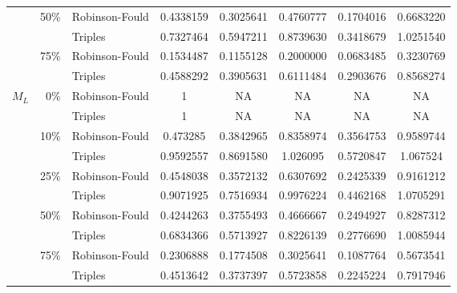 \begin{tabular}{rrlccccc}
              & 50\%         & Robinson-Fould & 0.4338159 & 0.3025641  & 0.4760777 & 0.1704016  & 0.6683220 \\
              &              & Triples        & 0.7327464 & 0.5947211  & 0.8739630 & 0.3418679  & 1.0251540 \\
              & 75\%         & Robinson-Fould & 0.1534487 & 0.1155128  & 0.2000000 & 0.0683485  & 0.3230769 \\
              &              & Triples        & 0.4588292 & 0.3905631  & 0.6111484 & 0.2903676  & 0.8568274 \\   
    $M_L$     & 0\%          & Robinson-Fould & 1 & NA  & NA & NA  & NA \\
              &              & Triples        & 1 & NA  & NA & NA  & NA \\
              & 10\%         & Robinson-Fould & 0.473285 & 0.3842965  & 0.8358974 & 0.3564753  & 0.9589744 \\
              &              & Triples        & 0.9592557 & 0.8691580  & 1.026095 & 0.5720847  & 1.067524 \\
              & 25\%         & Robinson-Fould & 0.4548038 & 0.3572132  & 0.6307692 & 0.2425339  & 0.9161212 \\
              &              & Triples        & 0.9071925 & 0.7516934  & 0.9976224 & 0.4462168  & 1.0705291 \\
              & 50\%         & Robinson-Fould & 0.4244263 & 0.3755493  & 0.4666667 & 0.2494927  & 0.8287312 \\
              &              & Triples        & 0.6834366 & 0.5713927  & 0.8226139 & 0.2776690  & 1.0085944 \\
              & 75\%         & Robinson-Fould & 0.2306888 & 0.1774508  & 0.3025641 & 0.1087764  & 0.5673541 \\
              &              & Triples        & 0.4513642 & 0.3737397  & 0.5723858 & 0.2245224  & 0.7917946 \\
    \hline
\end{tabular}